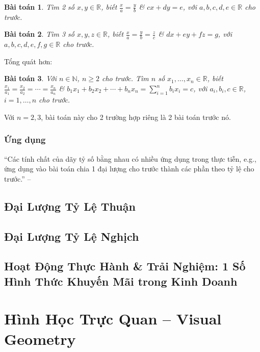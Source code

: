 \documentclass[oneside]{book}
\numberwithin{equation}{section}
\newtheorem{baitoan}{Bài toán}[section]
\begin{document}
\begin{baitoan}
	Tìm 2 số $x,y\in\mathbb{R}$, biết $\frac{x}{a} = \frac{y}{b}$ \& $cx + dy = e$, với $a,b,c,d,e\in\mathbb{R}$ cho trước.
\end{baitoan}

\begin{baitoan}
	Tìm 3 số $x,y,z\in\mathbb{R}$, biết $\frac{x}{a} = \frac{y}{b} = \frac{z}{c}$ \& $dx + ey + fz = g$, với $a,b,c,d,e,f,g\in\mathbb{R}$ cho trước.
\end{baitoan}
Tổng quát hơn:
\begin{baitoan}
	Với $n\in\mathbb{N}$, $n\ge 2$ cho trước. Tìm $n$ số $x_1,\ldots,x_n\in\mathbb{R}$, biết $\frac{x_1}{a_1} = \frac{x_2}{a_2} = \cdots = \frac{x_n}{a_n}$ \& $b_1x_1 + b_2x_2 + \cdots + b_nx_n = \sum_{i=1}^n b_ix_i = c$, với $a_i,b_i,c\in\mathbb{R}$, $i = 1,\ldots,n$ cho trước.
\end{baitoan}
Với $n = 2,3$, bài toán này cho 2 trường hợp riêng là 2 bài toán trước nó.

\subsection{Ứng dụng}
``Các tính chất của dãy tỷ số bằng nhau có nhiều ứng dụng trong thực tiễn, e.g., ứng dụng vào bài toán chia 1 đại lượng cho trước thành các phần theo tỷ lệ cho trước.'' -- \cite[p. 57]{SGK_Toan_7_Canh_Dieu_tap_1}

\section{Đại Lượng Tỷ Lệ Thuận}

\section{Đại Lượng Tỷ Lệ Nghịch}

\section{Hoạt Động Thực Hành \& Trải Nghiệm: 1 Số Hình Thức Khuyến Mãi trong Kinh Doanh}


\chapter{Hình Học Trực Quan -- Visual Geometry}
\end{document}
